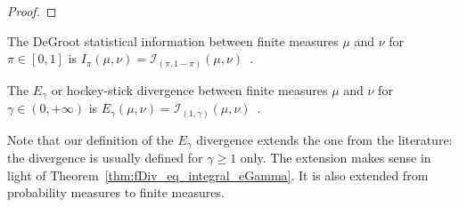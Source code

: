 \begin{proof}\leanok
{}
\end{proof}


\begin{definition}
  \label{def:deGrootInfo}
  \leanok
  The DeGroot statistical information between finite measures $\mu$ and $\nu$ for $\pi \in [0,1]$ is $I_\pi (\mu, \nu) = \mathcal I_{(\pi, 1 - \pi)}(\mu, \nu)$~.
\end{definition}


\begin{definition}
  \label{def:eGamma}
  \leanok
  The $E_\gamma$ or hockey-stick divergence between finite measures $\mu$ and $\nu$ for $\gamma \in (0,+\infty)$ is $E_\gamma(\mu, \nu) = \mathcal I_{(1,\gamma)}(\mu, \nu)$~.
\end{definition}

Note that our definition of the $E_\gamma$ divergence extends the one from the literature: the divergence is usually defined for $\gamma \ge 1$ only.
The extension makes sense in light of Theorem~\ref{thm:fDiv_eq_integral_eGamma}.
It is also extended from probability measures to finite measures.


%
%



